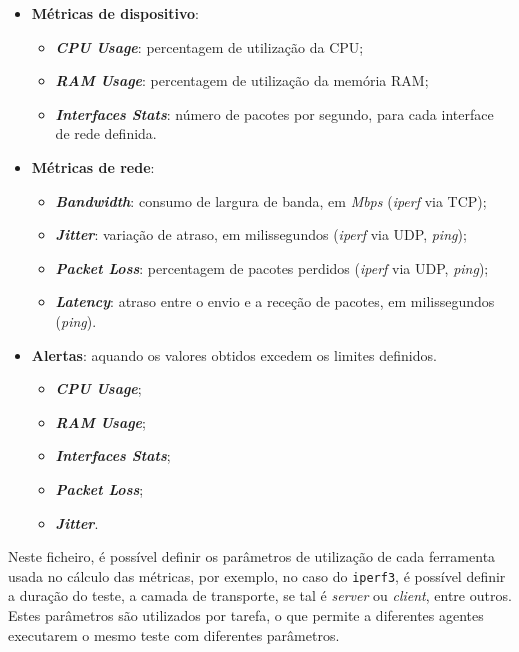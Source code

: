 \documentclass[a4paper,12pt]{scrreprt}
\begin{document}
\begin{itemize}
    \item \textbf{Métricas de dispositivo}:
    \begin{itemize}
        \item \textbf{\textit{CPU Usage}}: percentagem de utilização da CPU;
        \item \textbf{\textit{RAM Usage}}: percentagem de utilização da memória RAM;
        \item \textbf{\textit{Interfaces Stats}}: número de pacotes por segundo,
            para cada interface de rede definida.
    \end{itemize}
    \item \textbf{Métricas de rede}:
    \begin{itemize}
        \item \textbf{\textit{Bandwidth}}: consumo de largura de banda, em \textit{Mbps} (\textit{iperf} via TCP);
        \item \textbf{\textit{Jitter}}: variação de atraso, em milissegundos (\textit{iperf} via UDP, \textit{ping});
        \item \textbf{\textit{Packet Loss}}: percentagem de pacotes perdidos (\textit{iperf} via UDP, \textit{ping});
        \item \textbf{\textit{Latency}}: atraso entre o envio e a receção de pacotes, em milissegundos (\textit{ping}).
    \end{itemize}
    \item \textbf{Alertas}: aquando os valores obtidos excedem os limites definidos.
    \begin{itemize}
        \item \textbf{\textit{CPU Usage}};
        \item \textbf{\textit{RAM Usage}};
        \item \textbf{\textit{Interfaces Stats}};
        \item \textbf{\textit{Packet Loss}};
        \item \textbf{\textit{Jitter}}.
    \end{itemize}
\end{itemize}

Neste ficheiro, é possível definir os parâmetros de utilização de cada ferramenta usada no cálculo das métricas,
por exemplo, no caso do \texttt{iperf3}, é possível definir a duração do teste, a camada de transporte, se tal é
\textit{server} ou \textit{client}, entre outros. Estes parâmetros são utilizados por tarefa, o que permite a
diferentes agentes executarem o mesmo teste com diferentes parâmetros.
\end{document}
